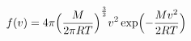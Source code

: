 \begin{eqnarray*}
f(v) = 4\pi {\Bigl(\frac{M}{2\pi RT}\Bigr) }^\frac{3}{2} v^{2} \exp \Bigl( - \frac{Mv^{2}}{2RT} \Bigr)
\label{}
\end{eqnarray*}